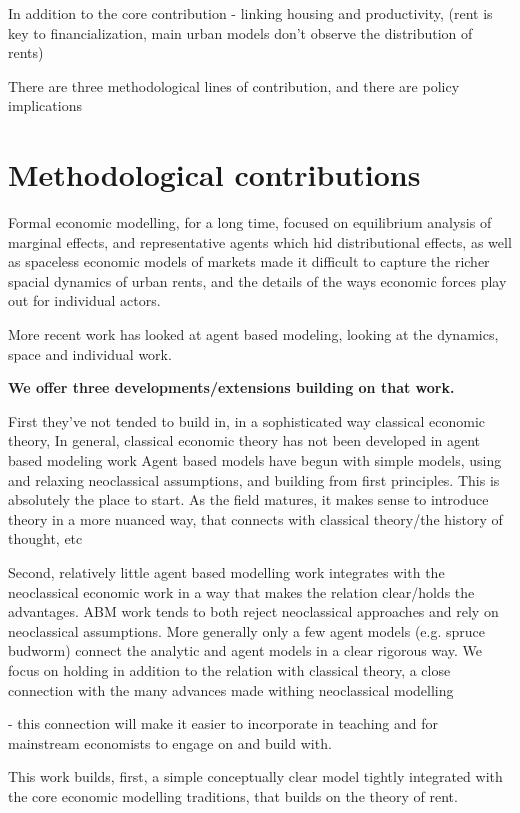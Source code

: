 In addition to the core contribution - linking housing and productivity, 
(rent is key to financialization, main urban models don't observe the distribution of rents)

There are three methodological lines of contribution, and there are policy implications

\section{Methodological contributions}


Formal economic modelling, for a long time, focused on equilibrium analysis of marginal effects, and representative agents which hid distributional effects, as well as spaceless economic models of markets made it difficult to capture the richer spacial dynamics of urban rents, and the details of the ways economic forces play out for individual actors.

More recent work has looked at agent based modeling, looking at the dynamics, space and individual work. 

\textbf{We offer three developments/extensions building on that work.}


First they've not tended to build in, in a sophisticated way classical economic theory,
In general, classical economic theory has not been developed in agent based modeling work
Agent based models have begun with simple models, using and relaxing neoclassical assumptions, and building from first principles. This is absolutely the place to start. As the field matures, it makes sense to introduce theory in a more nuanced way, that connects with classical theory/the history of thought, etc

Second, relatively little agent based modelling work integrates with the neoclassical economic work in a way that makes the relation clear/holds the advantages. ABM work tends to both reject neoclassical approaches and rely on neoclassical assumptions.
More generally only a few agent models (e.g. spruce budworm) connect the analytic and agent models in a clear rigorous way. We focus on holding in addition to the relation with classical theory, a close connection with the many advances made withing neoclassical modelling

- this connection will make it easier to incorporate in teaching and for mainstream economists to engage on and build with.


This work builds, first, a simple conceptually clear model tightly integrated with the core economic modelling traditions, that builds on the theory of rent.


